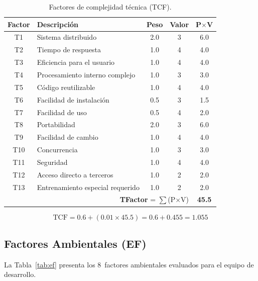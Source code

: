 \begin{table}[H]
\centering
\begin{tabular}{|c|p{}|c|c|c|}
\hline
\textbf{Factor} & \textbf{Descripción} & \textbf{Peso} & \textbf{Valor} & \textbf{P$\times$V} \\
\hline
T1 & Sistema distribuido & 2.0 & 3 & 6.0 \\
\hline
T2 & Tiempo de respuesta & 1.0 & 4 & 4.0 \\
\hline
T3 & Eficiencia para el usuario & 1.0 & 4 & 4.0 \\
\hline
T4 & Procesamiento interno complejo & 1.0 & 3 & 3.0 \\
\hline
T5 & Código reutilizable & 1.0 & 4 & 4.0 \\
\hline
T6 & Facilidad de instalación & 0.5 & 3 & 1.5 \\
\hline
T7 & Facilidad de uso & 0.5 & 4 & 2.0 \\
\hline
T8 & Portabilidad & 2.0 & 3 & 6.0 \\
\hline
T9 & Facilidad de cambio & 1.0 & 4 & 4.0 \\
\hline
T10 & Concurrencia & 1.0 & 3 & 3.0 \\
\hline
T11 & Seguridad & 1.0 & 4 & 4.0 \\
\hline
T12 & Acceso directo a terceros & 1.0 & 2 & 2.0 \\
\hline
T13 & Entrenamiento especial requerido & 1.0 & 2 & 2.0 \\
\hline
\multicolumn{4}{|r|}{\textbf{TFactor} = $\sum$(P$\times$V)} & \textbf{45.5} \\
\hline
\end{tabular}
\caption{Factores de complejidad técnica (TCF).}
\label{tab:tcf}
\end{table}

\[
\text{TCF} = 0.6 + (0.01 \times 45.5) = 0.6 + 0.455 = \mathbf{1.055}
\]

\subsection{Factores Ambientales (EF)}

La Tabla~\ref{tab:ef} presenta los 8~factores ambientales evaluados para el equipo de desarrollo.

